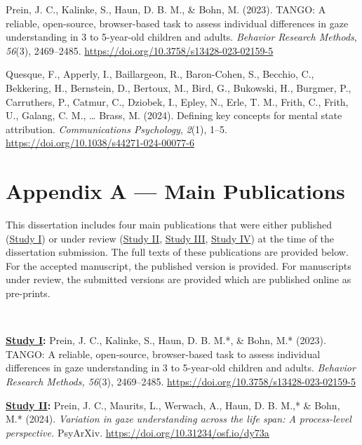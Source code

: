 \documentclass[
]{scrbook}
\newlength{\cslhangindent}
\newenvironment{CSLReferences}[2] %
 {\begin{list}{}{%
  \setlength{\itemindent}{0pt}
  \setlength{\leftmargin}{0pt}
  \setlength{\parsep}{0pt}
  \ifodd #1
   \setlength{\leftmargin}{\cslhangindent}
   \setlength{\itemindent}{-1\cslhangindent}
  \fi
  \setlength{\itemsep}{#2\baselineskip}}}
 {\end{list}}
\begin{document}
\label{refs}
\begin{CSLReferences}{1}{0}
Prein, J. C., Kalinke, S., Haun, D. B. M., \& Bohn, M. (2023). {TANGO}: {A} reliable, open-source, browser-based task to assess individual differences in gaze understanding in 3 to 5-year-old children and adults. \emph{Behavior Research Methods}, \emph{56}(3), 2469--2485. \url{https://doi.org/10.3758/s13428-023-02159-5}

Quesque, F., Apperly, I., Baillargeon, R., Baron-Cohen, S., Becchio, C., Bekkering, H., Bernstein, D., Bertoux, M., Bird, G., Bukowski, H., Burgmer, P., Carruthers, P., Catmur, C., Dziobek, I., Epley, N., Erle, T. M., Frith, C., Frith, U., Galang, C. M., \ldots{} Brass, M. (2024). Defining key concepts for mental state attribution. \emph{Communications Psychology}, \emph{2}(1), 1--5. \url{https://doi.org/10.1038/s44271-024-00077-6}

\end{CSLReferences}

\chapter{Appendix A --- Main Publications}\label{appendixA}

This dissertation includes four main publications that were either published (\hyperref[studyI]{Study I}) or under review (\hyperref[studyII]{Study II}, \hyperref[studyIII]{Study III}, \hyperref[studyIV]{Study IV}) at the time of the dissertation submission. The full texts of these publications are provided below. For the accepted manuscript, the published version is provided. For manuscripts under review, the submitted versions are provided which are published online as pre-prints.

~

\textbf{\hyperref[studyI]{Study I}:} Prein, J. C., Kalinke, S., Haun, D. B. M.*, \& Bohn, M.* (2023). TANGO: A reliable, open-source, browser-based task to assess individual differences in gaze understanding in 3 to 5-year-old children and adults. \emph{Behavior Research Methods, 56}(3), 2469--2485. \url{https://doi.org/10.3758/s13428-023-02159-5}

\textbf{\hyperref[studyII]{Study II}:} Prein, J. C., Maurits, L., Werwach, A., Haun, D. B. M.,* \& Bohn, M.* (2024). \emph{Variation in gaze understanding across the life span: A process-level perspective.} PsyArXiv. \url{https://doi.org/10.31234/osf.io/dy73a}
\end{document}
